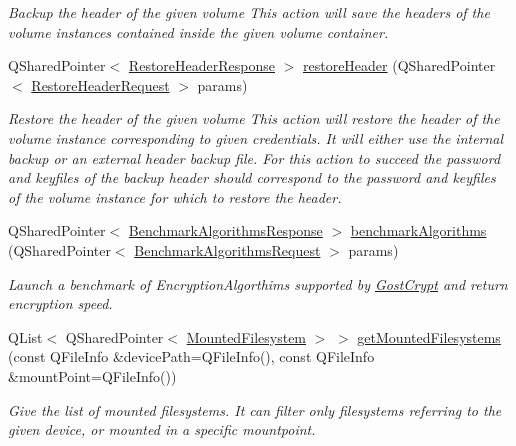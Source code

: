 \begin{DoxyCompactItemize}
\begin{DoxyCompactList}\small\item\em Backup the header of the given volume This action will save the headers of the volume instances contained inside the given volume container. \end{DoxyCompactList}\item 
Q\+Shared\+Pointer$<$ \hyperlink{struct_gost_crypt_1_1_core_1_1_restore_header_response}{Restore\+Header\+Response} $>$ \hyperlink{class_gost_crypt_1_1_core_1_1_core_base_a206b9b51031f6389b95e568cd4bf9828}{restore\+Header} (Q\+Shared\+Pointer$<$ \hyperlink{struct_gost_crypt_1_1_core_1_1_restore_header_request}{Restore\+Header\+Request} $>$ params)
\begin{DoxyCompactList}\small\item\em Restore the header of the given volume This action will restore the header of the volume instance corresponding to given credentials. It will either use the internal backup or an external header backup file. For this action to succeed the password and keyfiles of the backup header should correspond to the password and keyfiles of the volume instance for which to restore the header. \end{DoxyCompactList}\item 
Q\+Shared\+Pointer$<$ \hyperlink{struct_gost_crypt_1_1_core_1_1_benchmark_algorithms_response}{Benchmark\+Algorithms\+Response} $>$ \hyperlink{class_gost_crypt_1_1_core_1_1_core_base_a3591596ab66503c56dde92619938fffc}{benchmark\+Algorithms} (Q\+Shared\+Pointer$<$ \hyperlink{struct_gost_crypt_1_1_core_1_1_benchmark_algorithms_request}{Benchmark\+Algorithms\+Request} $>$ params)
\begin{DoxyCompactList}\small\item\em Launch a benchmark of Encryption\+Algorthims supported by \hyperlink{namespace_gost_crypt}{Gost\+Crypt} and return encryption speed. \end{DoxyCompactList}\item 
Q\+List$<$ Q\+Shared\+Pointer$<$ \hyperlink{struct_gost_crypt_1_1_core_1_1_mounted_filesystem}{Mounted\+Filesystem} $>$ $>$ \hyperlink{class_gost_crypt_1_1_core_1_1_core_base_ab97891dae6ee36c867e02766a5223063}{get\+Mounted\+Filesystems} (const Q\+File\+Info \&device\+Path=Q\+File\+Info(), const Q\+File\+Info \&mount\+Point=Q\+File\+Info())
\begin{DoxyCompactList}\small\item\em Give the list of mounted filesystems. It can filter only filesystems referring to the given device, or mounted in a specific mountpoint. \end{DoxyCompactList}\item 

\end{DoxyCompactItemize}
